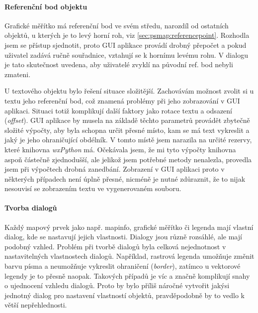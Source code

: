 \documentclass[a4paper,12pt,draft]{article}
\begin{document}
{ \paragraph*{Referenční bod objektu}
 Grafické měřítko má referenční bod ve svém středu, narozdíl
 od ostatních objektů, u kterých je to levý horní roh, viz
 \ref{sec:psmap:referencepoint}. Rozhodla jsem se přístup sjednotit,
 proto GUI aplikace provádí drobný přepočet a pokud uživatel zadává
 ručně souřadnice, vztahují se k hornímu levému rohu. V dialogu je
 tato skutečnost uvedena, aby uživatelé zvyklí na původní ref. bod
 nebyli zmateni.

 U textového objektu bylo řešení situace složitější. Zachovávám
 možnost zvolit si u textu jeho referenční bod, což znamená problémy
 při jeho zobrazování v GUI aplikaci. Situaci totiž komplikují další
 faktory jako rotace textu a odsazení (\emph{offset}).
 GUI aplikace by musela na základě těchto parametrů provádět zbytečně
 složité výpočty, aby byla schopna určit přesné místo, kam se
 má text vykreslit a jaký je jeho ohraničující obdélník. V tomto
 místě jsem narazila na určité rezervy, které knihovna \emph{wxPython}
 má. Očekávala jsem, že mi tyto výpočty knihovna aspoň částečně
 zjednodušší, ale jelikož jsem potřebné metody nenalezla, provedla
 jsem při výpočtech drobná zanedbání. Zobrazení v GUI aplikaci proto
 v některých případech není úplně přesné, nicméně je nutné
 zdůraznit, že to nijak nesouvisí se zobrazením textu ve  vygenerovaném
 souboru.

 \paragraph*{Tvorba dialogů}
 Každý mapový prvek jako např. mapinfo, grafické měřítko či legenda
 mají vlastní dialog, kde se nastavují jejich vlastnosti. Dialogy jsou
 různě rozsáhlé, ale mají podobný vzhled. Problém při tvorbě
 dialogů byla celková nejednotnost v nastavitelných vlastnostech
 dialogů. Například, rastrová legenda umožňuje změnit barvu písma a
 neumožňuje vykreslit ohraničení (\emph{border}), zatímco u vektorové
 legendy je to přesně naopak. Takových případů je víc a značně
 komplikují snahy o ujednocení vzhledu dialogů. Proto by bylo příliš
 náročné vytvořit jakýsi jednotný dialog pro nastavení vlastností
 objektů, pravděpodobně by to vedlo k větší nepřehlednosti.

}
\end{document}
